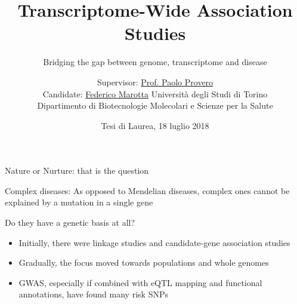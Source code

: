 \documentclass[aspectratio=169,12pt]{beamer}
\title{Transcriptome-Wide Association Studies}
\subtitle{\small Bridging the gap between genome, transcriptome and 
disease}
\author[Federico Marotta]
{
	\footnotesize
	Supervisor: \href{mailto:paolo.provero@unito.it}{Prof. Paolo 
		Provero}
	\\
	Candidate: \href{mailto:federico.marotta@edu.unito.it}{Federico 
		Marotta}
	\vfill
	\scriptsize
	Università degli Studi di Torino
	\\
	Dipartimento di Biotecnologie Molecolari e Scienze per la Salute
	\vfill
}
\institute[UniTo, DBMSS]
{



}
\date{\tiny Tesi di Laurea, 18 luglio 2018}
\begin{document}
\maketitle


\begin{frame}{Nature or Nurture: that is the question}

	\bigskip

	\begin{block}{Complex diseases:}
		As opposed to Mendelian diseases, complex ones cannot be 
explained by a mutation in a single gene
	\end{block}

	\bigskip

	Do they have a genetic basis at all?

	\pause

	\begin{itemize}
		\item Initially, there were \alert{linkage studies} and 
			\alert{candidate-gene association studies}
		\item Gradually, the focus moved towards \alert{populations and 
				whole genomes}
		\item \alert{GWAS}, especially if combined with eQTL mapping and 
			functional annotations, have found many risk SNPs
	 \end{itemize}


\end{frame}




\end{document}
